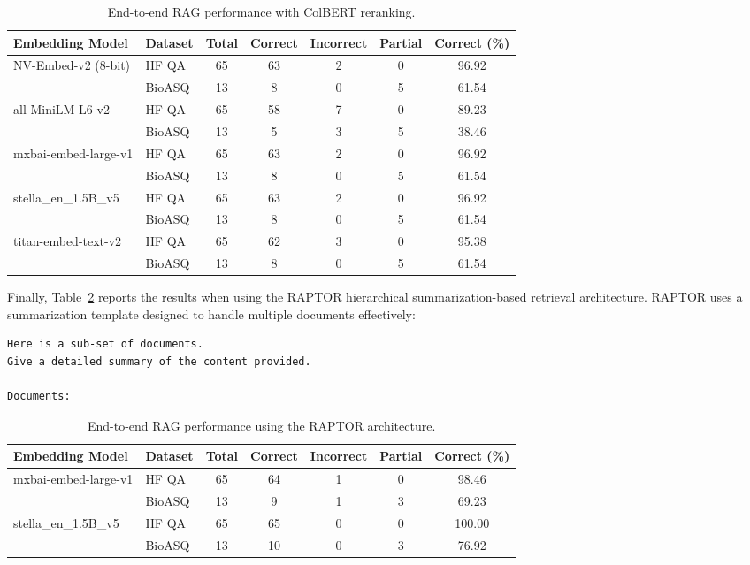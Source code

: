\documentclass{scrartcl}
\begin{document}
\begin{table}[H]
\centering
\small
\begin{tabular}{l l c c c c c}
\hline
\textbf{Embedding Model} & \textbf{Dataset} & \textbf{Total} & \textbf{Correct} & \textbf{Incorrect} & \textbf{Partial} & \textbf{Correct (\%)} \\
\hline
\multirow{2}{*}{NV-Embed-v2 (8-bit)} 
 & HF QA  & 65 & 63 & 2 & 0 & 96.92 \\
 & BioASQ & 13 & 8  & 0 & 5 & 61.54 \\
\hline
\multirow{2}{*}{all-MiniLM-L6-v2} 
 & HF QA  & 65 & 58 & 7 & 0 & 89.23 \\
 & BioASQ & 13 & 5  & 3 & 5 & 38.46 \\
\hline
\multirow{2}{*}{mxbai-embed-large-v1} 
 & HF QA  & 65 & 63 & 2 & 0 & 96.92 \\
 & BioASQ & 13 & 8  & 0 & 5 & 61.54 \\
\hline
\multirow{2}{*}{stella\_en\_1.5B\_v5} 
 & HF QA  & 65 & 63 & 2 & 0 & 96.92 \\
 & BioASQ & 13 & 8  & 0 & 5 & 61.54 \\
\hline
\multirow{2}{*}{titan-embed-text-v2} 
 & HF QA  & 65 & 62 & 3 & 0 & 95.38 \\
 & BioASQ & 13 & 8  & 0 & 5 & 61.54 \\
\hline
\end{tabular}
\caption{End-to-end RAG performance with ColBERT reranking.}
\label{table:rag_eval_rerank}
\end{table}

Finally, Table~\ref{table:rag_eval_raptor} reports the results when using the RAPTOR hierarchical summarization-based retrieval architecture. RAPTOR uses a summarization template designed to handle multiple documents effectively:

\begin{verbatim}
Here is a sub-set of documents. 
Give a detailed summary of the content provided.

Documents:
\end{verbatim}


\begin{table}[H]
\centering
\small
\begin{tabular}{l l c c c c c}
\hline
\textbf{Embedding Model} & \textbf{Dataset} & \textbf{Total} & \textbf{Correct} & \textbf{Incorrect} & \textbf{Partial} & \textbf{Correct (\%)} \\
\hline
\multirow{2}{*}{mxbai-embed-large-v1} 
 & HF QA  & 65 & 64 & 1 & 0 & 98.46 \\
 & BioASQ & 13 & 9  & 1 & 3 & 69.23 \\
\hline
\multirow{2}{*}{stella\_en\_1.5B\_v5} 
 & HF QA  & 65 & 65 & 0 & 0 & 100.00 \\
 & BioASQ & 13 & 10 & 0 & 3 & 76.92 \\
\hline
\end{tabular}
\caption{End-to-end RAG performance using the RAPTOR architecture.}
\label{table:rag_eval_raptor}
\end{table}
\end{document}
